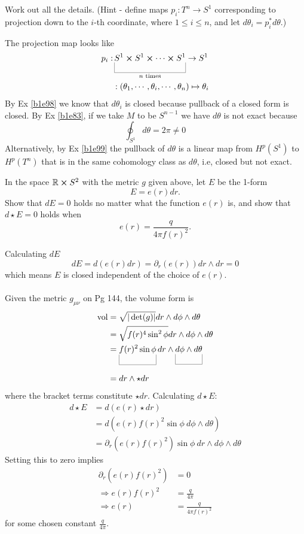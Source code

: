 \documentclass[10pt]{article}
\begin{document}
\begin{example}
	Work out all the details. (Hint - define maps $p_i:T^n \to S^1$ corresponding to projection down to the $i$-th coordinate, where $1 \le i \le n$, and let $d\theta_i = p_i^*d\theta$.)
\end{example}
\sol The projection map looks like
$$
\begin{aligned}
	p_i:&\ub{S^1 \cross S^1\cross \cdots \cross S^1}{n\text{ times}} \to S^1\\
	&:(\theta_1, \cdots, \theta_i, \cdots, \theta_n) \mapsto \theta_i
\end{aligned}
$$
By Ex \ref{b1e98} we know that $d\theta_i$ is closed because pullback of a closed form is closed. By Ex \ref{b1e83}, if we take $M$ to be $S^{n-1}$ we have $d\theta$ is not exact because
$$
\oint_{S^1} d\theta = 2\pi \ne 0
$$
Alternatively, by Ex \ref{b1e99} the pullback of $d\theta$ is a linear map from $H^p(S^1)$ to $H^p(T^n)$ that is in the same cohomology class as $d\theta$, i.e, closed but not exact.


\begin{example}\label{b1e104}
	In the space $\mathbb{R} \cross S^2$ with the metric $g$ given above, let $E$ be the 1-form
	$$
		E = e(r)dr.
	$$
	Show that $dE=0$ holds no matter what the function $e(r)$ is, and show that $d\star E=0$ holds when
	$$
		e(r)=\frac{q}{4\pi f(r)^2}.
	$$
\end{example}
\sol Calculating $dE$
$$
dE = d(e(r)dr) = \partial_r(e(r)) dr \wedge dr = 0
$$
which means $E$ is closed independent of the choice of $e(r)$.\\\\
Given the metric $g_{\mu\nu}$ on Pg 144, the volume form is
$$
\begin{aligned}
	\vol &= \sqrt{|\det (g)|} dr \wedge d\phi \wedge d\theta\\
	&= \sqrt{f(r)^4 \sin^2\phi} dr \wedge d\phi \wedge d\theta\\
	&= \ub{f(r)^2 \sin\phi}{} dr \wedge \ub{d\phi \wedge d\theta}{}\\
	&= dr \wedge \star dr
\end{aligned}
$$
where the bracket terms constitute $\star dr$. Calculating $d\star E$:
$$
\begin{aligned}
	d\star E &= d(e(r) \star dr)\\
	&= d(e(r) f(r)^2 \sin\phi\:d\phi \wedge d\theta)\\
	&= \partial_r(e(r) f(r)^2) \sin\phi\:dr \wedge d\phi \wedge d\theta
\end{aligned}
$$
Setting this to zero implies
$$
\begin{aligned}
	\partial_r(e(r) f(r)^2) &= 0\\
	\Rightarrow e(r) f(r)^2 &= \frac{q}{4\pi}\\
	\Rightarrow e(r) &= \frac{q}{4\pi f(r)^2}
\end{aligned}
$$
for some chosen constant $\frac{q}{4\pi}$.
\end{document}
